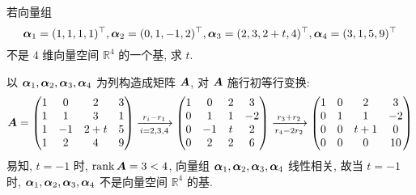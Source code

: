 \begin{example}
    若向量组 $$\vb*{\alpha}_1=(1,1,1,1)^\top, \vb*{\alpha}_2=(0,1,-1,2)^\top, \vb*{\alpha}_3=(2,3,2+t,4)^\top, \vb*{\alpha}_4=(3,1,5,9)^\top$$
    不是 $4$ 维向量空间 $\mathbb{R}^4$ 的一个基, 求 $t$.
\end{example}
\begin{solution}
    以 $\vb*{\alpha}_1, \vb*{\alpha}_2, \vb*{\alpha}_3, \vb*{\alpha}_4$ 为列构造成矩阵 $\vb*{A}$, 对 $\vb*{A}$ 施行初等行变换:
    $$
    \vb*{A}=\begin{pmatrix} 1 & 0 & 2 & 3 \\ 1 & 1 & 3 & 1 \\ 1 & -1 & 2+t & 5 \\ 1 & 2 & 4 & 9 \\\end{pmatrix}\xrightarrow[i=2,3,4]{r_i-r_1}\begin{pmatrix} 1 & 0 & 2 & 3 \\ 0 & 1 & 1 & -2 \\ 0 & -1 & t & 2 \\ 0 & 2 & 2 & 6 \\\end{pmatrix}\xrightarrow[r_4-2r_2]{r_3+r_2}\begin{pmatrix} 1 & 0 & 2 & 3 \\ 0 & 1 & 1 & -2 \\ 0 & 0 & t+1 & 0 \\ 0 & 0 & 0 & 10 \\\end{pmatrix}
    $$
    易知, $t=-1$ 时, $\rank\vb*{A}=3<4$, 向量组 $\vb*{\alpha}_1, \vb*{\alpha}_2, \vb*{\alpha}_3, \vb*{\alpha}_4$ 线性相关, 故当 $t=-1$ 时, $\vb*{\alpha}_1, \vb*{\alpha}_2, \vb*{\alpha}_3, \vb*{\alpha}_4$ 不是向量空间 $\mathbb{R}^{4}$ 的基.
\end{solution}

